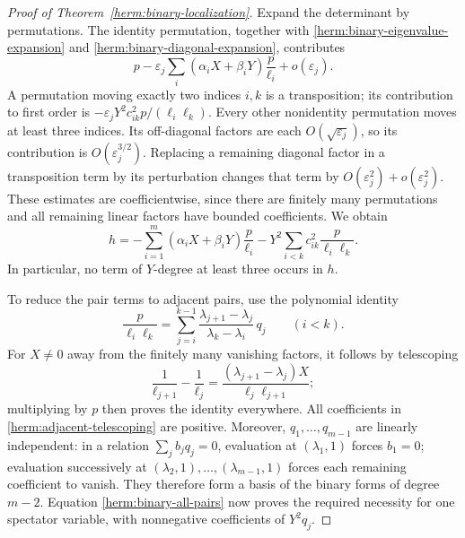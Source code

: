 \documentclass[reqno]{amsart}
\theoremstyle{definition}
\theoremstyle{remark}
\begin{document}
\begin{proof}[Proof of Theorem~\ref{herm:binary-localization}]
Expand the determinant by permutations.  The identity permutation,
together with \eqref{herm:binary-eigenvalue-expansion} and
\eqref{herm:binary-diagonal-expansion}, contributes
\[
 p-\varepsilon_j\sum_i(\alpha_iX+\beta_iY)\frac p{\ell_i}
 +o(\varepsilon_j).
\]
A permutation moving exactly two indices $i,k$ is a transposition;
its contribution to first order is
$-\varepsilon_jY^2c_{ik}^2p/(\ell_i\ell_k)$.
Every other nonidentity permutation moves at least three indices.
Its off-diagonal factors are each $O(\sqrt{\varepsilon_j})$, so its
contribution is $O(\varepsilon_j^{3/2})$.  Replacing a remaining
diagonal factor in a transposition term by its perturbation changes
that term by $O(\varepsilon_j^2)+o(\varepsilon_j^2)$.
These estimates are coefficientwise, since there are finitely many
permutations and all remaining linear factors have bounded coefficients.
We obtain
\begin{equation}\label{herm:binary-all-pairs}
 h=-\sum_{i=1}^m(\alpha_iX+\beta_iY)\frac p{\ell_i}
   -Y^2\sum_{i<k}c_{ik}^2\frac p{\ell_i\ell_k}.
\end{equation}
In particular, no term of $Y$-degree at least three occurs in $h$.

To reduce the pair terms to adjacent pairs, use the polynomial identity
\begin{equation}\label{herm:adjacent-telescoping}
 \frac p{\ell_i\ell_k}
 =\sum_{j=i}^{k-1}
    \frac{\lambda_{j+1}-\lambda_j}{\lambda_k-\lambda_i}\,q_j
 \qquad(i<k).
\end{equation}
For $X\ne0$ away from the finitely many vanishing factors, it follows
by telescoping
\[
 \frac1{\ell_{j+1}}-\frac1{\ell_j}
 =\frac{(\lambda_{j+1}-\lambda_j)X}{\ell_j\ell_{j+1}};
\]
multiplying by $p$ then proves the identity everywhere.
All coefficients in \eqref{herm:adjacent-telescoping} are positive.
Moreover, $q_1,\ldots,q_{m-1}$ are linearly independent: in a relation
$\sum_jb_jq_j=0$, evaluation at $(\lambda_1,1)$ forces $b_1=0$;
evaluation successively at $(\lambda_2,1),\ldots,(\lambda_{m-1},1)$
forces each remaining coefficient to vanish.  They therefore form a
basis of the binary forms of degree $m-2$.  Equation
\eqref{herm:binary-all-pairs} now proves the required necessity for
one spectator variable, with nonnegative coefficients of $Y^2q_j$.


\end{proof}
\end{document}
